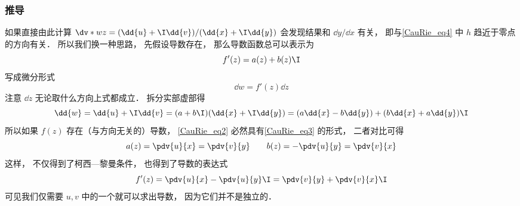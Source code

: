 \subsubsection{推导}
如果直接由此计算 $\dv*{w}{z} = (\dd{u} + \I \dd{v})/(\dd{x} + \I \dd{y})$ 会发现结果和 $\dd{y}/\dd{x}$ 有关， 即与\autoref{CauRie_eq4} 中 $h$ 趋近于零点的方向有关． 所以我们换一种思路， 先假设导数存在， 那么导数函数总可以表示为
\begin{equation}
f'(z) = a(z) + b(z)\I
\end{equation}
写成微分形式
\begin{equation}
\dd{w} = f'(z)\dd{z}
\end{equation}
注意 $\dd z$ 无论取什么方向上式都成立． 拆分实部虚部得
\begin{equation}\label{CauRie_eq3}
\dd{w} = \dd{u} + \I \dd{v} = (a + b\I)(\dd{x} + \I\dd{y}) = (a \dd{x} - b\dd{y}) + (b \dd{x} + a\dd{y})\I
\end{equation}
所以如果 $f(z)$ 存在（与方向无关的）导数， \autoref{CauRie_eq2} 必然具有\autoref{CauRie_eq3} 的形式， 二者对比可得
\begin{equation}
a(z) = \pdv{u}{x} = \pdv{v}{y} \qquad
b(z) = -\pdv{u}{y} = \pdv{v}{x}
\end{equation}
这样， 不仅得到了柯西—黎曼条件， 也得到了导数的表达式
\begin{equation}
f'(z) = \pdv{u}{x} -\pdv{u}{y} \I = \pdv{v}{y} + \pdv{v}{x}\I
\end{equation}
可见我们仅需要 $u, v$ 中的一个就可以求出导数， 因为它们并不是独立的．

